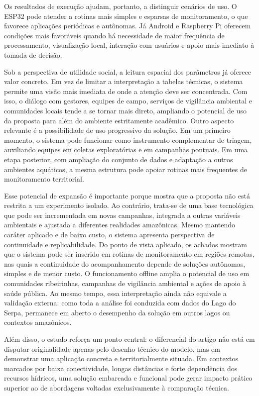 Os resultados de execu\c{c}\~ao ajudam, portanto, a distinguir cen\'arios de uso. O ESP32 pode atender a rotinas mais simples e esparsas de monitoramento, o que favorece aplica\c{c}\~oes peri\'odicas e aut\^onomas. J\'a Android e Raspberry Pi oferecem condi\c{c}\~oes mais favor\'aveis quando h\'a necessidade de maior frequ\^encia de processamento, visualiza\c{c}\~ao local, intera\c{c}\~ao com usu\'arios e apoio mais imediato \`a tomada de decis\~ao.

Sob a perspectiva de utilidade social, a leitura espacial dos par\^ametros j\'a oferece valor concreto. Em vez de limitar a interpreta\c{c}\~ao a tabelas t\'ecnicas, o sistema permite uma vis\~ao mais imediata de onde a aten\c{c}\~ao deve ser concentrada. Com isso, o di\'alogo com gestores, equipes de campo, servi\c{c}os de vigil\^ancia ambiental e comunidades locais tende a se tornar mais direto, ampliando o potencial de uso da proposta para al\'em do ambiente estritamente acad\^emico. Outro aspecto relevante \'e a possibilidade de uso progressivo da solu\c{c}\~ao. Em um primeiro momento, o sistema pode funcionar como instrumento complementar de triagem, auxiliando equipes em coletas explorat\'orias e em campanhas pontuais. Em uma etapa posterior, com amplia\c{c}\~ao do conjunto de dados e adapta\c{c}\~ao a outros ambientes aqu\'aticos, a mesma estrutura pode apoiar rotinas mais frequentes de monitoramento territorial.

Esse potencial de expans\~ao \'e importante porque mostra que a proposta n\~ao est\'a restrita a um experimento isolado. Ao contr\'ario, trata-se de uma base tecnol\'ogica que pode ser incrementada em novas campanhas, integrada a outras vari\'aveis ambientais e ajustada a diferentes realidades amaz\^onicas. Mesmo mantendo car\'ater aplicado e de baixo custo, o sistema apresenta perspectiva de continuidade e replicabilidade. Do ponto de vista aplicado, os achados mostram que o sistema pode ser inserido em rotinas de monitoramento em regi\~oes remotas, nas quais a continuidade do acompanhamento depende de solu\c{c}\~oes aut\^onomas, simples e de menor custo. O funcionamento offline amplia o potencial de uso em comunidades ribeirinhas, campanhas de vigil\^ancia ambiental e a\c{c}\~oes de apoio \`a sa\'ude p\'ublica. Ao mesmo tempo, essa interpreta\c{c}\~ao ainda n\~ao equivale a valida\c{c}\~ao externa: como toda a an\'alise foi conduzida com dados do Lago do Serpa, permanece em aberto o desempenho da solu\c{c}\~ao em outros lagos ou contextos amaz\^onicos.

Al\'em disso, o estudo refor\c{c}a um ponto central: o diferencial do artigo n\~ao est\'a em disputar originalidade apenas pelo desenho t\'ecnico do modelo, mas em demonstrar uma aplica\c{c}\~ao concreta e territorialmente situada. Em contextos marcados por baixa conectividade, longas dist\^ancias e forte depend\^encia dos recursos h\'idricos, uma solu\c{c}\~ao embarcada e funcional pode gerar impacto pr\'atico superior ao de abordagens voltadas exclusivamente \`a compara\c{c}\~ao t\'ecnica.

